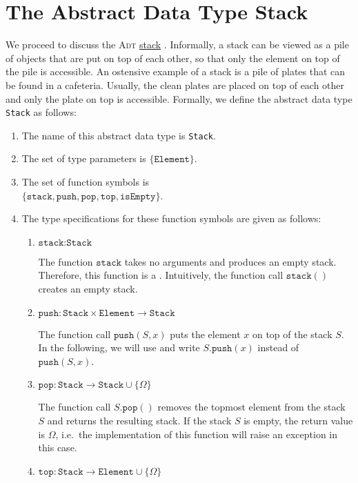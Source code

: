 \section{The Abstract Data Type Stack}
We proceed to discuss the \textsc{Adt} \href{https://en.wikipedia.org/wiki/Stack_(abstract_data_type)}{stack} 
. 
Informally, a stack can be viewed as a pile of objects that are put on top of each other, so that
only the element on top of the pile is accessible.  An ostensive example of a stack is a pile of
plates that can be found in a cafeteria.  Usually, the clean plates are placed on top of each other
and only the plate on top is accessible.  Formally, we define the abstract data type
\texttt{Stack} as follows: 
\begin{enumerate}
\item The name of this abstract data type is \texttt{Stack}.
\item The set of type parameters is $\{ \texttt{Element} \}$.
\item The set of function symbols is \\[0.2cm]
      \hspace*{1.3cm} 
      $\bigl\{ \texttt{stack}, \texttt{push}, \texttt{pop}, \texttt{top}, \texttt{isEmpty} \bigr\}$.
\item The type specifications for these function symbols are given as follows:
      \begin{enumerate}
      \item $\texttt{stack}: \texttt{Stack}$

            The function $\texttt{stack}$ takes no arguments and produces an empty stack.
            Therefore, this function is a .  Intuitively, the function call $\texttt{stack}()$ 
            creates an empty stack.
      \item $\texttt{push}: \texttt{Stack} \times \texttt{Element} \rightarrow \texttt{Stack}$

            The function call $\texttt{push}(S,x)$ puts the element $x$ on top of the stack $S$.  In
            the following, we will use 
            and write $S.\texttt{push}(x)$ instead of $\texttt{push}(S,x)$.
      \item $\texttt{pop}: \texttt{Stack}  \rightarrow \texttt{Stack} \cup \{ \Omega \}$

            The function call $S.\texttt{pop}()$ removes the topmost element from the stack $S$ and returns the
            resulting stack.  If the stack $S$ is empty, the return value is $\Omega$, i.e.~the implementation
            of this function will raise an exception in this case.
      \item $\texttt{top}: \texttt{Stack} \rightarrow \texttt{Element} \cup \{ \Omega \}$


\end{enumerate}
\end{enumerate}
